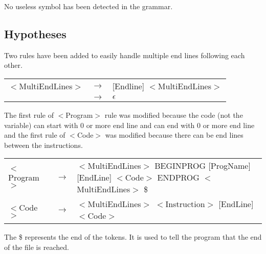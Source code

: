 \documentclass{article}
\begin{document}
\noindent No useless symbol has been detected in the grammar.

\subsection{Hypotheses}
Two rules have been added to easily handle multiple end lines following each other.

\begin{center}
\begin{tabular}{|m{2.5cm} m{0.5cm} m{12cm}|}
\hline
$<$MultiEndLines$>$ & $\to$ & [Endline] $<$MultiEndLines$>$ \\
& $\to$ & $\epsilon$ \\
\hline
\end{tabular}
\end{center}

\noindent The first rule of $<$Program$>$ rule was modified because the code (not the variable) can start with 0 or more end line and can end with 0 or more end line and the first rule of $<$Code$>$ was modified because there can be end lines between the instructions.\\

\begin{center}
\begin{tabular}{|m{2.5cm} m{0.5cm} m{12cm}|}
\hline
$<$Program$>$ & $\to$ & $<$MultiEndLines$>$ BEGINPROG [ProgName] [EndLine] $<$Code$>$ ENDPROG $<$MultiEndLines$>$ \$ \\

$<$Code$>$ & $\to$ & $<$MultiEndLines$>$ $<$Instruction$>$ [EndLine] $<$Code$>$ \\

\hline
\end{tabular}
\end{center}

\noindent The \$ represents the end of the tokens. It is used to tell the program that the end of the file is reached.
\end{document}
